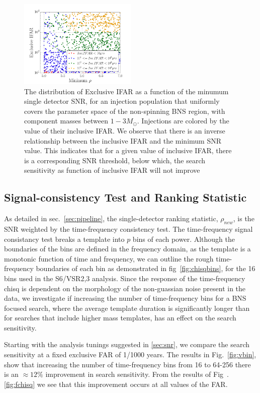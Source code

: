 \begin{figure}
\centering
\includegraphics[width=0.5\textwidth]{papers/bns_o1_dev/figures/ifarifar.png}
\caption{\label{fig:ifarifar} 
The distribution of Exclusive IFAR as a function of the minumum single detector SNR, for an injection population that uniformly covers the parameter space of the non-spinning BNS region, with component masses between $1- 3M_\odot$. Injections are colored by the value of their inclusive IFAR. We observe that there is an inverse relationship between the inclusive IFAR and the minimum SNR value. This indicates that for a given value of inclusive IFAR, there is a corresponding SNR threshold, below which, the search sensitivity as function of inclusive IFAR will not improve
}
\end{figure}


\subsection{Signal-consistency Test and Ranking Statistic}
\label{sec:chisq}

As detailed in sec.~\ref{sec:pipeline}, the single-detector ranking statistic, $\rho_{new}$, is the SNR weighted by the time-frequency consistency test. The time-frequency signal consistancy test breaks a template into $p$ bins of each power. Although the boundaries of the bins are defined in the frequency domain, as the template is a monotonic function of time and frequency, we can outline the rough time-frequency boundaries of each bin as demonstrated in fig~\ref{fig:chisqbins}, for the 16 bins used in the S6/VSR2,3 analysis. Since the response of the time-frequency chisq is dependent on the morphology of the non-guassian noise present in the data, we investigate if increasing the number of time-frequency bins for a BNS focused search, where the average template duration is significantly longer than for searches that include higher mass templates, has an effect on the search sensitivity.

Starting with the analysis tunings suggested in \ref{sec:snr}, we compare the search sensitivity at a fixed exclusive FAR of 1/1000 years. The results in Fig.~\ref{fig:vbin}, show that increasing the number of time-frequency bins from 16 to 64-256 there is an $\approx 12\%$ improvement in search sensitivity. From the results of Fig~.\ref{fig:fchisq} we see  that this improvement occurs at all values of the FAR.

